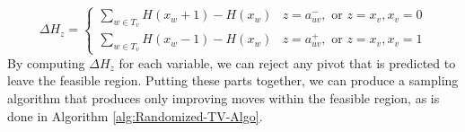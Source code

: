 \documentclass[pdflatex,sn-mathphys-num]{sn-jnl}%
\newtheorem{prop}[theorem]{Proposition}
\begin{document}
\begin{equation} \label{eq:delta-H}
    \Delta H_z = \begin{cases}
        \sum_{w \in T_v} H(x_w + 1) - H(x_w) & z = a_{uv}^-, \text{ or } z = x_v, x_v = 0\\
        \sum_{w \in T_v} H(x_w - 1) - H(x_w) & z = a_{uv}^+, \text{ or } z = x_v, x_v = 1
    \end{cases}
\end{equation}
By computing $\Delta H_z$ for each variable, we can reject any pivot that is predicted to leave the feasible region.
Putting these parts together, we can produce a sampling algorithm that produces only improving moves within the feasible region, as is done in Algorithm \ref{alg:Randomized-TV-Algo}.



\end{document}
